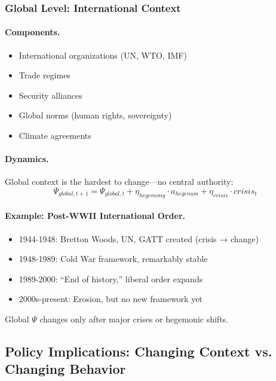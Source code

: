 \documentclass[12pt,a4paper]{article}
\begin{document}
\subsubsection{Global Level: International Context}

\paragraph{Components.}
\begin{itemize}
  \item International organizations (UN, WTO, IMF)
  \item Trade regimes
  \item Security alliances
  \item Global norms (human rights, sovereignty)
  \item Climate agreements
\end{itemize}

\paragraph{Dynamics.}
Global context is the hardest to change---no central authority:
\begin{equation}
  \Psi_{global, t+1} = \Psi_{global, t} + \eta_{hegemony} \cdot a_{hegemon} 
                      + \eta_{crisis} \cdot crisis_t
\end{equation}

\paragraph{Example: Post-WWII International Order.}
\begin{itemize}
  \item 1944-1948: Bretton Woods, UN, GATT created (crisis → change)
  \item 1948-1989: Cold War framework, remarkably stable
  \item 1989-2000: ``End of history,'' liberal order expands
  \item 2000s-present: Erosion, but no new framework yet
\end{itemize}

Global $\Psi$ changes only after major crises or hegemonic shifts.

\subsection{Policy Implications: Changing Context vs. Changing Behavior}
\end{document}
